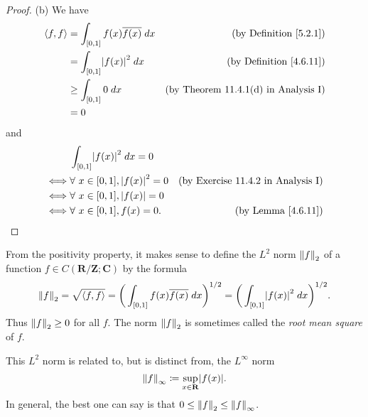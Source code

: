 \begin{proof}{(b)}
    We have
    \begin{align*}
        \inner*{f, f} & = \int_{[0, 1]} f(x) \overline{f(x)} \; dx & \text{(by Definition \ref{5.2.1})}          \\
                      & = \int_{[0, 1]} \abs*{f(x)}^2 \; dx        & \text{(by Definition \ref{4.6.11})}         \\
                      & \geq \int_{[0, 1]} 0 \; dx                 & \text{(by Theorem 11.4.1(d) in Analysis I)} \\
                      & = 0
    \end{align*}
    and
    \begin{align*}
             & \int_{[0, 1]} \abs*{f(x)}^2 \; dx = 0                                                \\
        \iff & \forall\ x \in [0, 1], \abs*{f(x)}^2 = 0 & \text{(by Exercise 11.4.2 in Analysis I)} \\
        \iff & \forall\ x \in [0, 1], \abs*{f(x)} = 0                                               \\
        \iff & \forall\ x \in [0, 1], f(x) = 0.         & \text{(by Lemma \ref{4.6.11})}
    \end{align*}
\end{proof}

\begin{note}
    From the positivity property, it makes sense to define the \(L^2\) norm \(\norm*{f}_2\) of a function \(f \in C(\mathbf{R} / \mathbf{Z} ; \mathbf{C})\) by the formula
    \[
        \norm*{f}_2 = \sqrt{\inner*{f, f}} = \bigg(\int_{[0, 1]} f(x) \overline{f(x)} \; dx\bigg)^{1 / 2} = \bigg(\int_{[0, 1]} \abs*{f(x)}^2 \; dx\bigg)^{1 / 2}.
    \]
    Thus \(\norm*{f}_2 \geq 0\) for all \(f\).
    The norm \(\norm*{f}_2\) is sometimes called the \emph{root mean square} of \(f\).
\end{note}

\begin{note}
    This \(L^2\) norm is related to, but is distinct from, the \(L^\infty\) norm
    \[
        \norm*{f}_\infty \coloneqq \sup_{x \in \mathbf{R}} \abs*{f(x)}.
    \]
    In general, the best one can say is that \(0 \leq \norm*{f}_2 \leq \norm*{f}_\infty\).
\end{note}

